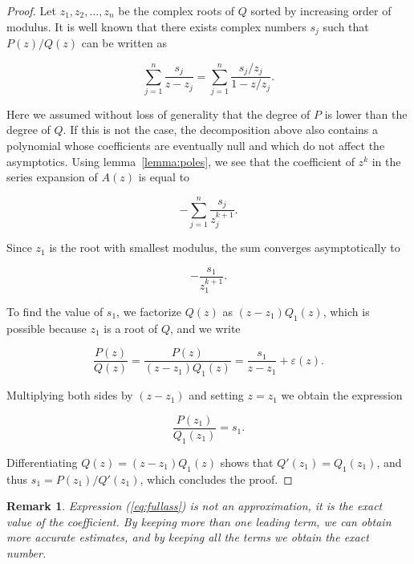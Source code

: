 \documentclass{article}
\newtheorem{remark}{Remark}
\begin{document}
\begin{proof}
Let $z_1, z_2, \ldots, z_n$ be the complex roots of $Q$ sorted by
increasing order of modulus. It is well known that there exists complex
numbers $s_j$ such that $P(z)/Q(z)$ can be written as

\begin{equation}
\sum_{j=1}^n \frac{s_j}{z-z_j} =
\sum_{j=1}^n \frac{s_j/z_j}{1-z/z_j}.
\end{equation}

Here we assumed without loss of generality that the degree of $P$ is lower
than the degree of $Q$. If this is not the case, the decomposition above
also contains a polynomial whose coefficients are eventually null and
which do not affect the asymptotics. Using lemma~\ref{lemma:poles}, we see
that the coefficient of $z^k$ in the series expansion of $A(z)$ is equal
to

\begin{equation}
\label{eq:fullass}
-\sum_{j=1}^n \frac{s_j}{z_j^{k+1}}.
\end{equation}

Since $z_1$ is the root with smallest modulus, the sum converges
asymptotically to

\begin{equation*}
-\frac{s_1}{z_1^{k+1}}.
\end{equation*}

To find the value of $s_1$, we factorize $Q(z)$ as
$(z-z_1)Q_1(z)$, which is possible because $z_1$ is a root of $Q$,
and we write

\begin{equation*}
\frac{P(z)}{Q(z)} =
\frac{P(z)}{(z-z_1)Q_1(z)} = \frac{s_1}{z-z_1} +
\varepsilon(z).
\end{equation*}

Multiplying both sides by $(z-z_1)$ and setting $z = z_1$ we obtain
the expression

\begin{equation*}
\frac{P(z_1)}{Q_1(z_1)} = s_1.
\end{equation*}

Differentiating $Q(z) = (z-z_1)Q_1(z)$ shows that $Q'(z_1) =
Q_1(z_1)$, and thus $s_1 = P(z_1) / Q'(z_1)$, which concludes the proof.
\end{proof}

\begin{remark}
Expression (\ref{eq:fullass}) is not an approximation, it is the exact
value of the coefficient. By keeping more than one leading term, we can
obtain more accurate estimates, and by keeping all the terms we obtain the
exact number.
\end{remark}
\end{document}
